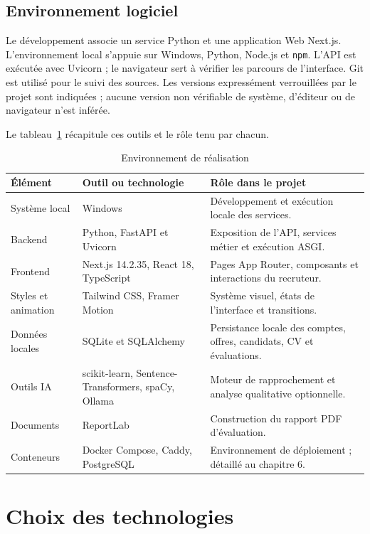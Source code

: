 \subsection{Environnement logiciel}

Le développement associe un service Python et une application Web Next.js. L'environnement local s'appuie sur Windows, Python, Node.js et \texttt{npm}. L'API est exécutée avec Uvicorn ; le navigateur sert à vérifier les parcours de l'interface. Git est utilisé pour le suivi des sources. Les versions expressément verrouillées par le projet sont indiquées ; aucune version non vérifiable de système, d'éditeur ou de navigateur n'est inférée.

Le tableau~\ref{tab:chap5-environment} récapitule ces outils et le rôle tenu par chacun.

\begin{table}[H]
\centering
\small
\caption{Environnement de réalisation}
\label{tab:chap5-environment}
\begin{tabularx}{\textwidth}{|l|l|X|}
\hline
\textbf{Élément} & \textbf{Outil ou technologie} & \textbf{Rôle dans le projet}\\
\hline
Système local & Windows & Développement et exécution locale des services.\\
\hline
Backend & Python, FastAPI et Uvicorn & Exposition de l'API, services métier et exécution ASGI.\\
\hline
Frontend & Next.js 14.2.35, React 18, TypeScript & Pages App Router, composants et interactions du recruteur.\\
\hline
Styles et animation & Tailwind CSS, Framer Motion & Système visuel, états de l'interface et transitions.\\
\hline
Données locales & SQLite et SQLAlchemy & Persistance locale des comptes, offres, candidats, CV et évaluations.\\
\hline
Outils IA & scikit-learn, Sentence-Transformers, spaCy, Ollama & Moteur de rapprochement et analyse qualitative optionnelle.\\
\hline
Documents & ReportLab & Construction du rapport PDF d'évaluation.\\
\hline
Conteneurs & Docker Compose, Caddy, PostgreSQL & Environnement de déploiement ; détaillé au chapitre 6.\\
\hline
\end{tabularx}
\end{table}

\section{Choix des technologies}

